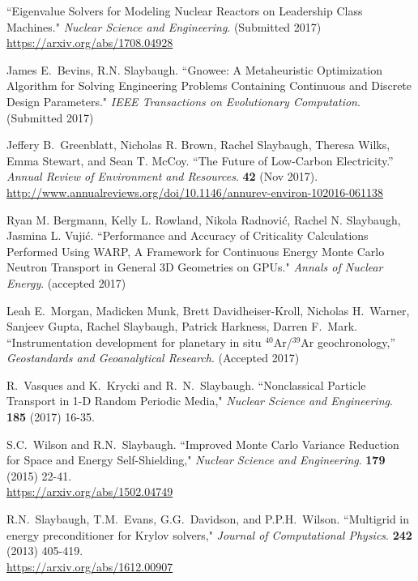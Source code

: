 \begin{bibsection}
\item ``Eigenvalue Solvers for Modeling Nuclear Reactors on Leadership Class Machines." \textit{Nuclear Science and Engineering}. (Submitted 2017)\\
\url{https://arxiv.org/abs/1708.04928}

\item  James E.\ Bevins, R.N. Slaybaugh. ``Gnowee: A Metaheuristic Optimization Algorithm for Solving Engineering Problems Containing Continuous and Discrete Design Parameters." \textit{IEEE Transactions on Evolutionary Computation}. (Submitted 2017)

\item Jeffery B.\ Greenblatt, Nicholas R. Brown, Rachel Slaybaugh, Theresa Wilks, Emma Stewart, and Sean T. McCoy. ``The Future of Low-Carbon Electricity.'' \textit{Annual Review of Environment and Resources}. \textbf{42} (Nov 2017). \\
\url{http://www.annualreviews.org/doi/10.1146/annurev-environ-102016-061138}

\item Ryan M. Bergmann, Kelly L. Rowland, Nikola Radnovi\'c, Rachel N. Slaybaugh, Jasmina L. Vuji\'c. ``Performance and Accuracy of Criticality Calculations Performed Using WARP, A Framework for Continuous Energy Monte Carlo Neutron Transport in General 3D Geometries on GPUs." \textit{Annals of Nuclear Energy}. (accepted 2017)

\item Leah E.\ Morgan, Madicken Munk, Brett Davidheiser-Kroll, Nicholas H.\ Warner, Sanjeev Gupta, Rachel Slaybaugh, Patrick Harkness, Darren F.\ Mark. ``Instrumentation development for planetary in situ $^{40}$Ar/$^{39}$Ar geochronology,'' \textit{Geostandards and Geoanalytical Research}. (Accepted 2017)

\item R.\ Vasques and K.\ Krycki and R.\ N.\ Slaybaugh. ``Nonclassical Particle Transport in 1-D Random Periodic Media," \textit{Nuclear Science and Engineering}.  \textbf{185} (2017) 16-35.

\item S.C.\ Wilson and R.N.\ Slaybaugh. ``Improved Monte Carlo Variance Reduction for Space and Energy Self-Shielding," \textit{Nuclear Science and Engineering}. \textbf{179} (2015) 22-41.\\
\url{https://arxiv.org/abs/1502.04749}

\item R.N.\ Slaybaugh, T.M.\ Evans, G.G.\ Davidson, and P.P.H.\ Wilson. ``Multigrid in energy preconditioner for Krylov solvers," \textit{Journal of Computational Physics}. \textbf{242} (2013) 405-419.\\
\url{https://arxiv.org/abs/1612.00907}


\end{bibsection}
